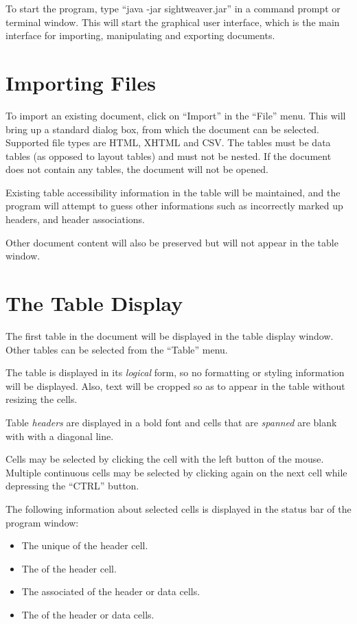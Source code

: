 To start the program, type ``java -jar sightweaver.jar'' in a command prompt or
terminal window. This will start the graphical user interface, which is the
main interface for importing, manipulating and exporting documents.

\section*{Importing Files}

To import an existing document, click on ``Import'' in the ``File'' menu. This
will bring up a standard dialog box, from which the document can be selected.
Supported file types are HTML, XHTML and CSV. The tables must be data tables (as
opposed to layout tables) and must not be nested. If the document does not
contain any tables, the document will not be opened.

Existing table accessibility information in the table will be maintained, and
the program will attempt to guess other informations such as incorrectly
marked up headers, and header associations.

Other document content will also be preserved but will not appear in the 
table window.

\section*{The Table Display}

The first table in the document will be displayed in the table display window.
Other tables can be selected from the ``Table'' menu.

The table is displayed in its \emph{logical} form, so no formatting or styling
information will be displayed. Also, text will be cropped so as to appear in
the table without resizing the cells.

Table \emph{headers} are displayed in a bold font and cells that are
\emph{spanned} are blank with with a diagonal line. 

Cells may be selected by clicking the cell with the left button of the mouse. 
Multiple continuous cells may be selected by clicking again on the next
cell while depressing the ``CTRL'' button.

The following information about selected cells is displayed in the status bar of
the program window:

\begin{itemize}

\item The unique  of the header cell.

\item The  of the header cell.

\item The associated  of the header or data cells.

\item The  of the header or data cells.

\end{itemize}

